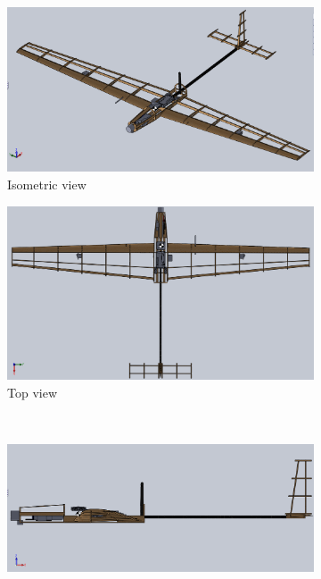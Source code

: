 \documentclass[11pt]{article}
\begin{document}
\begin{figure}[h!]
  \centering
    \begin{subfigure}[b]{0.49\textwidth}
                \includegraphics[width=\textwidth]{Figures/CAD/iso.png}
                \caption{Isometric view}
        \end{subfigure}
        \begin{subfigure}[b]{0.49\textwidth}
                \includegraphics[width=\textwidth]{Figures/CAD/top.png}
                \caption{Top view}
        \end{subfigure}
        \\
        \begin{subfigure}[b]{0.49\textwidth}
                \includegraphics[width=\textwidth]{Figures/CAD/side.png}

\end{subfigure}
\end{figure}
\end{document}
